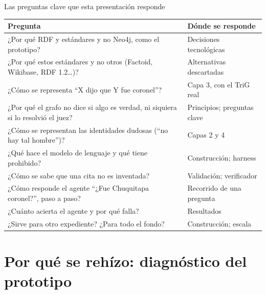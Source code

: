 \documentclass[aspectratio=169,10pt]{beamer}
\begin{document}
\begin{frame}[shrink=11]{Las preguntas clave que esta presentación responde}
\small
\begin{tabular}{@{}p{7.6cm}p{5.6cm}@{}}
\toprule
Pregunta & Dónde se responde \\
\midrule
¿Por qué RDF y estándares y no Neo4j, como el prototipo? & Decisiones tecnológicas \\
¿Por qué estos estándares y no otros (Factoid, Wikibase, RDF 1.2…)? & Alternativas descartadas \\
¿Cómo se representa \enquote{X dijo que Y fue coronel}? & Capa 3, con el TriG real \\
¿Por qué el grafo no dice si algo es verdad, ni siquiera si lo resolvió el juez? & Principios; preguntas clave \\
¿Cómo se representan las identidades dudosas (\enquote{no hay tal hombre})? & Capas 2 y 4 \\
¿Qué hace el modelo de lenguaje y qué tiene prohibido? & Construcción; harness \\
¿Cómo se sabe que una cita no es inventada? & Validación; verificador \\
¿Cómo responde el agente \enquote{¿Fue Chuquitapa coronel?}, paso a paso? & Recorrido de una pregunta \\
¿Cuánto acierta el agente y por qué falla? & Resultados \\
¿Sirve para otro expediente? ¿Para todo el fondo? & Construcción; escala \\
\bottomrule
\end{tabular}
\end{frame}

\section{Por qué se rehízo: diagnóstico del prototipo}
\end{document}
